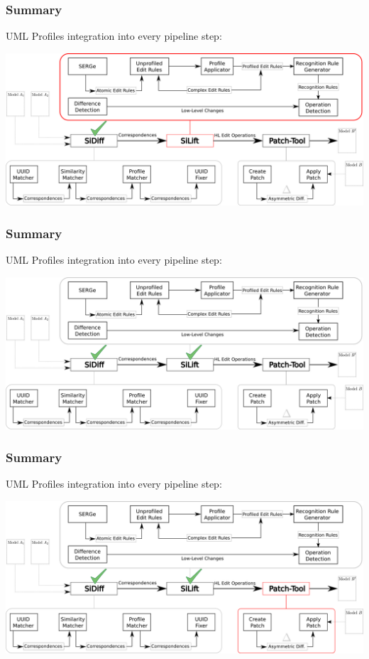 \documentclass[10pt]{beamer}
\begin{document}
\begin{frame}
\frametitle{Summary}
UML Profiles integration into every pipeline step:
\begin{center}
\includegraphics[scale=0.375]{integration_overview_ready_p3}\\
\end{center}

\end{frame}
\begin{frame}
\frametitle{Summary}
UML Profiles integration into every pipeline step:
\begin{center}
\includegraphics[scale=0.375]{integration_overview_ready_p4}\\
\end{center}
\end{frame}
\begin{frame}
\frametitle{Summary}
UML Profiles integration into every pipeline step:
\begin{center}
\includegraphics[scale=0.375]{integration_overview_ready_p5}\\
\end{center}

\end{frame}
\end{document}
